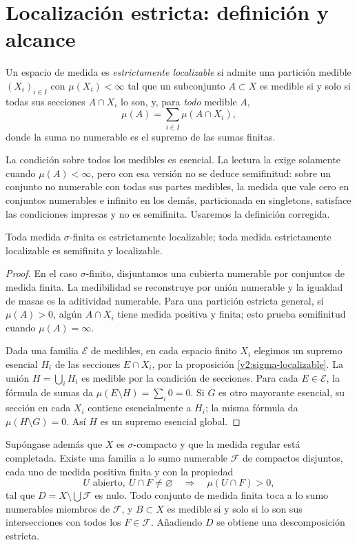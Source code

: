 \section{Localización estricta: definición y alcance}
\begin{definicion}
Un espacio de medida es \emph{estrictamente localizable} si admite una partición medible $(X_i)_{i\in I}$ con $\mu(X_i)<\infty$ tal que un subconjunto $A\subset X$ es medible si y solo si todas sus secciones $A\cap X_i$ lo son, y, para \emph{todo} medible $A$,
\[
 \mu(A)=\sum_{i\in I}\mu(A\cap X_i),
\]
donde la suma no numerable es el supremo de las sumas finitas.
\end{definicion}
La condición sobre todos los medibles es esencial. La lectura la exige solamente cuando $\mu(A)<\infty$, pero con esa versión no se deduce semifinitud: sobre un conjunto no numerable con todas sus partes medibles, la medida que vale cero en conjuntos numerables e infinito en los demás, particionada en singletons, satisface las condiciones impresas y no es semifinita. Usaremos la definición corregida.
\begin{proposicion}\label{v2:estricta-localizable}
Toda medida $\sigma$-finita es estrictamente localizable; toda medida estrictamente localizable es semifinita y localizable.
\end{proposicion}
\begin{proof}
En el caso $\sigma$-finito, disjuntamos una cubierta numerable por conjuntos de medida finita. La medibilidad se reconstruye por unión numerable y la igualdad de masas es la aditividad numerable. Para una partición estricta general, si $\mu(A)>0$, algún $A\cap X_i$ tiene medida positiva y finita; esto prueba semifinitud cuando $\mu(A)=\infty$.

Dada una familia $\mathcal E$ de medibles, en cada espacio finito $X_i$ elegimos un supremo esencial $H_i$ de las secciones $E\cap X_i$, por la proposición \ref{v2:sigma-localizable}. La unión $H=\bigcup_iH_i$ es medible por la condición de secciones. Para cada $E\in\mathcal E$, la fórmula de sumas da $\mu(E\setminus H)=\sum_i0=0$. Si $G$ es otro mayorante esencial, su sección en cada $X_i$ contiene esencialmente a $H_i$; la misma fórmula da $\mu(H\setminus G)=0$. Así $H$ es un supremo esencial global.
\end{proof}
\begin{teorema}\label{v2:compactos-localizacion}
Supóngase además que $X$ es $\sigma$-compacto y que la medida regular está completada. Existe una familia a lo sumo numerable $\mathcal F$ de compactos disjuntos, cada uno de medida positiva finita y con la propiedad
\[
 U\text{ abierto},\ U\cap F\ne\varnothing\quad\Longrightarrow\quad\mu(U\cap F)>0,
\]
tal que $D=X\setminus\bigcup\mathcal F$ es nulo. Todo conjunto de medida finita toca a lo sumo numerables miembros de $\mathcal F$, y $B\subset X$ es medible si y solo si lo son sus intersecciones con todos los $F\in\mathcal F$. Añadiendo $D$ se obtiene una descomposición estricta.
\end{teorema}
